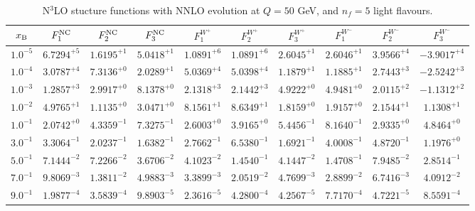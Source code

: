 \begin{table}[h]
\begin{adjustbox}{width=\textwidth}
\begin{tabular}{|c||c|c|c|c|c|c|c|c|c|}
\hline
$x_{\rm B}$ & $F_1^{\rm NC}$ & $F_2^{\rm NC}$ & $F_3^{\rm NC}$ & $F_1^{W^+}$ & $F_2^{W^+}$ & $F_3^{W^+}$ & $F_1^{W^-}$ & $F_2^{W^-}$ & $F_3^{W^-}$ \\
\hline
$ 1.0^{-5}$ & $ 6.7294^{+5}$ & $ 1.6195^{+1}$ & $ 5.0418^{+1}$ & $ 1.0891^{+6}$ & $ 1.0891^{+6}$ & $ 2.6045^{+1}$ & $ 2.6046^{+1}$ & $ 3.9566^{+4}$ & $-3.9017^{+4}$ \\
$ 1.0^{-4}$ & $ 3.0787^{+4}$ & $ 7.3136^{+0}$ & $ 2.0289^{+1}$ & $ 5.0369^{+4}$ & $ 5.0398^{+4}$ & $ 1.1879^{+1}$ & $ 1.1885^{+1}$ & $ 2.7443^{+3}$ & $-2.5242^{+3}$ \\
$ 1.0^{-3}$ & $ 1.2857^{+3}$ & $ 2.9917^{+0}$ & $ 8.1378^{+0}$ & $ 2.1318^{+3}$ & $ 2.1442^{+3}$ & $ 4.9222^{+0}$ & $ 4.9481^{+0}$ & $ 2.0115^{+2}$ & $-1.1312^{+2}$ \\
$ 1.0^{-2}$ & $ 4.9765^{+1}$ & $ 1.1135^{+0}$ & $ 3.0471^{+0}$ & $ 8.1561^{+1}$ & $ 8.6349^{+1}$ & $ 1.8159^{+0}$ & $ 1.9157^{+0}$ & $ 2.1544^{+1}$ & $ 1.1308^{+1}$ \\
$ 1.0^{-1}$ & $ 2.0742^{+0}$ & $ 4.3359^{-1}$ & $ 7.3275^{-1}$ & $ 2.6003^{+0}$ & $ 3.9165^{+0}$ & $ 5.4456^{-1}$ & $ 8.1640^{-1}$ & $ 2.9335^{+0}$ & $ 4.8464^{+0}$ \\
$ 3.0^{-1}$ & $ 3.3064^{-1}$ & $ 2.0237^{-1}$ & $ 1.6382^{-1}$ & $ 2.7662^{-1}$ & $ 6.5380^{-1}$ & $ 1.6921^{-1}$ & $ 4.0008^{-1}$ & $ 4.8720^{-1}$ & $ 1.1976^{+0}$ \\
$ 5.0^{-1}$ & $ 7.1444^{-2}$ & $ 7.2266^{-2}$ & $ 3.6706^{-2}$ & $ 4.1023^{-2}$ & $ 1.4540^{-1}$ & $ 4.1447^{-2}$ & $ 1.4708^{-1}$ & $ 7.9485^{-2}$ & $ 2.8514^{-1}$ \\
$ 7.0^{-1}$ & $ 9.8069^{-3}$ & $ 1.3811^{-2}$ & $ 4.9883^{-3}$ & $ 3.3899^{-3}$ & $ 2.0519^{-2}$ & $ 4.7699^{-3}$ & $ 2.8899^{-2}$ & $ 6.7416^{-3}$ & $ 4.0912^{-2}$ \\
$ 9.0^{-1}$ & $ 1.9877^{-4}$ & $ 3.5839^{-4}$ & $ 9.8903^{-5}$ & $ 2.3616^{-5}$ & $ 4.2800^{-4}$ & $ 4.2567^{-5}$ & $ 7.7170^{-4}$ & $ 4.7221^{-5}$ & $ 8.5591^{-4}$ \\
\hline
\end{tabular}
\end{adjustbox}\caption{N$^{3}$LO stucture functions with NNLO evolution at $Q = 50$ GeV, and $n_f=5$ light flavours.}
\label{tab:N3LO-Q50}
\end{table}


